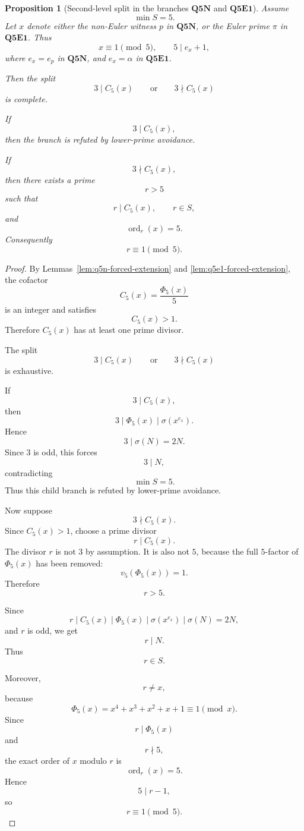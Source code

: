 \documentclass[11pt]{article}
\newtheorem{proposition}[theorem]{Proposition}
\theoremstyle{definition}
\theoremstyle{remark}
\DeclareMathOperator{\ord}{ord}
\begin{document}
\begin{proposition}[Second-level split in the branches \(\mathbf{Q5N}\) and \(\mathbf{Q5E1}\)]
\label{prop:q5-phi5-second-level-split}
Assume
\[
  \min S=5.
\]
Let \(x\) denote either the non-Euler witness \(p\) in \(\mathbf{Q5N}\), or the
Euler prime \(\pi\) in \(\mathbf{Q5E1}\).  Thus
\[
  x\equiv1\pmod5,
  \qquad
  5\mid e_x+1,
\]
where \(e_x=e_p\) in \(\mathbf{Q5N}\), and \(e_x=\alpha\) in
\(\mathbf{Q5E1}\).

Then the split
\[
  3\mid C_5(x)
  \qquad\text{or}\qquad
  3\nmid C_5(x)
\]
is complete.

If
\[
  3\mid C_5(x),
\]
then the branch is refuted by lower-prime avoidance.

If
\[
  3\nmid C_5(x),
\]
then there exists a prime
\[
  r>5
\]
such that
\[
  r\mid C_5(x),
  \qquad
  r\in S,
\]
and
\[
  \ord_r(x)=5.
\]
Consequently
\[
  r\equiv1\pmod5.
\]
\end{proposition}

\begin{proof}
By Lemmas~\ref{lem:q5n-forced-extension} and
\ref{lem:q5e1-forced-extension}, the cofactor
\[
  C_5(x)=\frac{\Phi_5(x)}5
\]
is an integer and satisfies
\[
  C_5(x)>1.
\]
Therefore \(C_5(x)\) has at least one prime divisor.

The split
\[
  3\mid C_5(x)
  \qquad\text{or}\qquad
  3\nmid C_5(x)
\]
is exhaustive.

If
\[
  3\mid C_5(x),
\]
then
\[
  3\mid \Phi_5(x)\mid \sigma(x^{e_x}).
\]
Hence
\[
  3\mid \sigma(N)=2N.
\]
Since \(3\) is odd, this forces
\[
  3\mid N,
\]
contradicting
\[
  \min S=5.
\]
Thus this child branch is refuted by lower-prime avoidance.

Now suppose
\[
  3\nmid C_5(x).
\]
Since \(C_5(x)>1\), choose a prime divisor
\[
  r\mid C_5(x).
\]
The divisor \(r\) is not \(3\) by assumption.  It is also not \(5\), because the
full \(5\)-factor of \(\Phi_5(x)\) has been removed:
\[
  v_5(\Phi_5(x))=1.
\]
Therefore
\[
  r>5.
\]

Since
\[
  r\mid C_5(x)\mid \Phi_5(x)\mid \sigma(x^{e_x})\mid \sigma(N)=2N,
\]
and \(r\) is odd, we get
\[
  r\mid N.
\]
Thus
\[
  r\in S.
\]

Moreover,
\[
  r\ne x,
\]
because
\[
  \Phi_5(x)=x^4+x^3+x^2+x+1\equiv1\pmod x.
\]
Since
\[
  r\mid\Phi_5(x)
\]
and
\[
  r\nmid5,
\]
the exact order of \(x\) modulo \(r\) is
\[
  \ord_r(x)=5.
\]
Hence
\[
  5\mid r-1,
\]
so
\[
  r\equiv1\pmod5.
\]
\end{proof}
\end{document}
